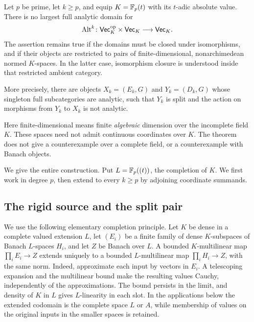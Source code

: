\begin{theorem}\label{dom:no-largest}
Let $p$ be prime, let $k\ge p$, and equip $K=\mathbb F_p(t)$ with its $t$\nobreakdash-adic absolute value.
There is no largest full analytic domain for
\[
\operatorname{Alt}^k\colon\mathsf{Vec}_K^{\mathrm{op}}\times\mathsf{Vec}_K\longrightarrow\mathsf{Vec}_K.
\]
The assertion remains true if the domains must be closed under isomorphisms, and if their objects are
restricted to pairs of finite-dimensional, nonarchimedean normed $K$\nobreakdash-spaces. In the latter case,
isomorphism closure is understood inside that restricted ambient category.

More precisely, there are objects $X_k=(E_k,G)$ and $Y_k=(D_k,G)$ whose singleton full subcategories
are analytic, such that $Y_k$ is split and the action on morphisms from $Y_k$ to $X_k$ is not analytic.
\end{theorem}

Here finite-dimensional means finite \emph{algebraic} dimension over the incomplete field $K$. These spaces
need not admit continuous coordinates over $K$. The theorem does not give a counterexample over a complete
field, or a counterexample with Banach objects.


We give the entire construction. Put $L=\mathbb F_p((t))$, the completion of $K$.
We first work in degree $p$, then extend to every $k\ge p$ by adjoining coordinate summands.

\subsection{The rigid source and the split pair}

We use the following elementary completion principle. Let $K$ be dense in a complete valued extension $L$,
let $(E_i)$ be a finite family of dense $K$\nobreakdash-subspaces of Banach $L$\nobreakdash-spaces $H_i$,
and let $Z$ be Banach over $L$.
A bounded $K$\nobreakdash-multilinear map $\prod_iE_i\to Z$ extends uniquely to a bounded
$L$\nobreakdash-multilinear map $\prod_iH_i\to Z$, with the same norm. Indeed, approximate each input by
vectors in $E_i$. A telescoping expansion and the multilinear bound make the resulting values Cauchy,
independently of the approximations. The bound persists in the limit, and density of $K$ in $L$ gives
$L$\nobreakdash-linearity in each slot. In the applications below the extended codomain is the complete
space $L$ or $A$, while membership of values on the original inputs in the smaller spaces is retained.

